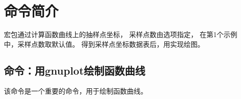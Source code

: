\documentclass[../main.tex]{subfiles}
\begin{document}
\section{命令简介}

宏包通过计算函数曲线上的抽样点坐标，
采样点数由选项指定，
在第1个示例中，采样点数取默认值。
得到采样点坐标数据表后，用\TIKZ{}实现绘图。

\subsection{命令：用gnuplot绘制函数曲线}
该命令是一个重要的命令，用于绘制函数曲线。\hypertarget{tfct}{}
\end{document}

